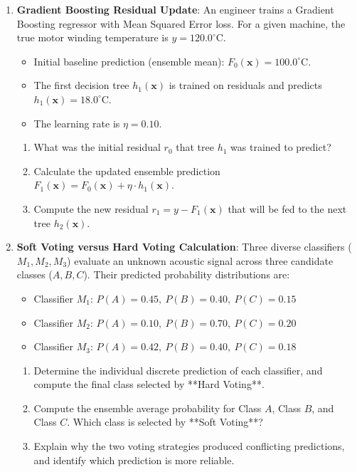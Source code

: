 \begin{checkyourself}
\begin{enumerate}
    \item \textbf{Gradient Boosting Residual Update}:
    An engineer trains a Gradient Boosting regressor with Mean Squared Error loss. For a given machine, the true motor winding temperature is $y = 120.0^\circ\text{C}$.
    \begin{itemize}
        \item Initial baseline prediction (ensemble mean): $F_0(\mathbf{x}) = 100.0^\circ\text{C}$.
        \item The first decision tree $h_1(\mathbf{x})$ is trained on residuals and predicts $h_1(\mathbf{x}) = 18.0^\circ\text{C}$.
        \item The learning rate is $\eta = 0.10$.
    \end{itemize}
    \begin{enumerate}[label=(\alph*)]
        \item What was the initial residual $r_0$ that tree $h_1$ was trained to predict?
        \item Calculate the updated ensemble prediction $F_1(\mathbf{x}) = F_0(\mathbf{x}) + \eta \cdot h_1(\mathbf{x})$.
        \item Compute the new residual $r_1 = y - F_1(\mathbf{x})$ that will be fed to the next tree $h_2(\mathbf{x})$.
    \end{enumerate}

    \item \textbf{Soft Voting versus Hard Voting Calculation}:
    Three diverse classifiers ($M_1, M_2, M_3$) evaluate an unknown acoustic signal across three candidate classes ($A, B, C$). Their predicted probability distributions are:
    \begin{itemize}
        \item Classifier $M_1$: $P(A) = 0.45, \ P(B) = 0.40, \ P(C) = 0.15$
        \item Classifier $M_2$: $P(A) = 0.10, \ P(B) = 0.70, \ P(C) = 0.20$
        \item Classifier $M_3$: $P(A) = 0.42, \ P(B) = 0.40, \ P(C) = 0.18$
    \end{itemize}
    \begin{enumerate}[label=(\alph*)]
        \item Determine the individual discrete prediction of each classifier, and compute the final class selected by **Hard Voting**.
        \item Compute the ensemble average probability for Class $A$, Class $B$, and Class $C$. Which class is selected by **Soft Voting**?
        \item Explain why the two voting strategies produced conflicting predictions, and identify which prediction is more reliable.
    \end{enumerate}
\end{enumerate}
\end{checkyourself}


